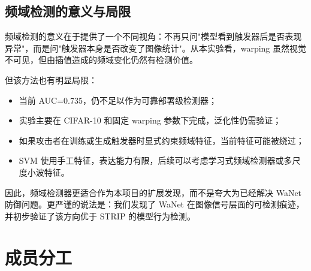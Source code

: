\documentclass[UTF8,zihao=-4]{ctexart}
\begin{document}
\subsection{频域检测的意义与局限}

频域检测的意义在于提供了一个不同视角：不再只问"模型看到触发器后是否表现异常"，而是问"触发器本身是否改变了图像统计"。从本实验看，warping 虽然视觉不可见，但由插值造成的频域变化仍然有检测价值。

但该方法也有明显局限：
\begin{itemize}
    \item 当前 AUC=0.735，仍不足以作为可靠部署级检测器；
    \item 实验主要在 CIFAR-10 和固定 warping 参数下完成，泛化性仍需验证；
    \item 如果攻击者在训练或生成触发器时显式约束频域特征，当前特征可能被绕过；
    \item SVM 使用手工特征，表达能力有限，后续可以考虑学习式频域检测器或多尺度小波特征。
\end{itemize}

因此，频域检测器更适合作为本项目的扩展发现，而不是夸大为已经解决 WaNet 防御问题。更严谨的说法是：我们发现了 WaNet 在图像信号层面的可检测痕迹，并初步验证了该方向优于 STRIP 的模型行为检测。

\section{成员分工}
\end{document}
